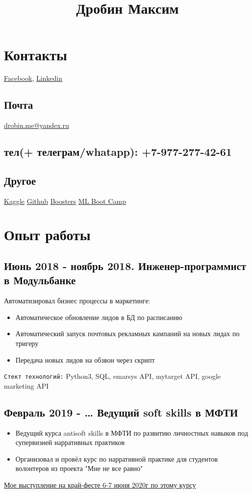 \documentclass[11pt]{article}
\date{}
\title{Дробин Максим}
\begin{document}
\maketitle
\section{Контакты}
\label{sec:org9a5cdce}
\href{https://www.facebook.com/profile.php?id=100042101110525}{Facebook}, \href{https://www.linkedin.com/in/maxim-drobin-a11b05154/}{Linkedin}
\subsection{Почта}
\label{sec:orgaa90f26}
\href{mailto:drobin.me@yandex.ru}{drobin.me@yandex.ru}

\subsection{тел(+ телеграм/whatapp): +7-977-277-42-61}
\label{sec:org80b475c}
\subsection{Другое}
\label{sec:orgc4f5f73}
\href{https://www.kaggle.com/malahai}{Kaggle}
\href{https://github.com/gazon1/}{Github}
\href{https://boosters.pro/user/Malahai}{Boosters}
\href{https://cups.mail.ru/profile/309773}{ML Boot Camp}
\section{Опыт работы}
\label{sec:orga469c2d}
\subsection{Июнь 2018 - ноябрь 2018. Инженер-программист в Модульбанке}
\label{sec:org0425221}
Автоматизировал бизнес процессы в маркетинге: 
\begin{itemize}
\item Автоматическое обновление лидов в БД по расписанию
\item Автоматический запуск почтовых рекламных кампаний на новых лидах по тригеру
\item Передача новых лидов на обзвон через скрипт
\end{itemize}

\texttt{Стект технологий:}
Python3, SQL, emarsys API, mytarget API, google marketing API
\subsection{Февраль 2019 - \ldots{} Ведущий soft skills в МФТИ}
\label{sec:orgfb1e69d}
\begin{itemize}
\item Ведущий курса antisoft skills в МФТИ по развитию личностных навыков под супервизией нарративных практиков
\item Организовал и провёл курс по нарративной практике для студентов волонтеров из проекта "Мне не все равно"
\end{itemize}
\href{https://www.youtube.com/watch?v=EDkDUp0PgPE\&list=PL7GczH8KmOkD5QFvkeFVhJj6aGqpHkmeL\&index=12\&t=0s}{Мое выступление на край-фесте 6-7 июня 2020г по этому курсу}
\end{document}
